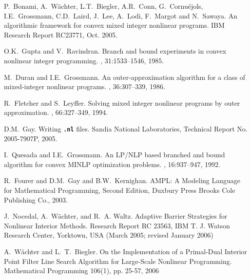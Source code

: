 \begin{thebibliography}{10}


P.~Bonami, A.~W\"achter, L.T.~Biegler, A.R.~Conn, G.~Cornu\'ejols,
I.E.~Grossmann, C.D.~Laird, J.~Lee, A.~Lodi, F.~Margot and
N.~Sawaya.
\newblock An algorithmic framework for convex mixed integer nonlinear programs. IBM Research Report RC23771, Oct. 2005.

O.K.~Gupta and V.~Ravindran.
\newblock Branch and bound experiments in convex nonlinear integer programming.
, 31:1533--1546, 1985.


M.~Duran and I.E.~Grossmann.
\newblock An outer-approximation algorithm for a class of mixed-integer nonlinear programs.
, 36:307--339, 1986.

R.~Fletcher and S.~Leyffer.
\newblock Solving mixed integer nonlinear programs by outer approximation.
, 66:327--349, 1994.

D.M.~Gay.
\newblock Writing \texttt{\bf .nl} files.
\newblock Sandia National Laboratories, Technical Report No. 2005-7907P, 2005.

I.~Quesada and I.E.~Grossmann.
\newblock An {LP/NLP} based branched and bound algorithm for convex {MINLP} optimization problems.
, 16:937--947, 1992.

R.~Fourer and D.M.~Gay and B.W.~Kernighan.
\newblock AMPL: A Modeling Language for Mathematical
Programming, Second Edition,
\newblock Duxbury Press Brooks Cole Publishing Co., 2003.


J.~Nocedal, A.~W\"achter, and R.~A. Waltz.
\newblock Adaptive Barrier Strategies for Nonlinear Interior Methods.
\newblock Research Report RC 23563, IBM T. J. Watson Research Center, Yorktown, USA (March 2005; revised January 2006)

A.~W\"achter and L.~T.~Biegler.
\newblock On the Implementation of a Primal-Dual Interior Point Filter Line Search Algorithm for Large-Scale Nonlinear Programming.
\newblock Mathematical Programming 106(1), pp. 25-57, 2006
\end{thebibliography}

